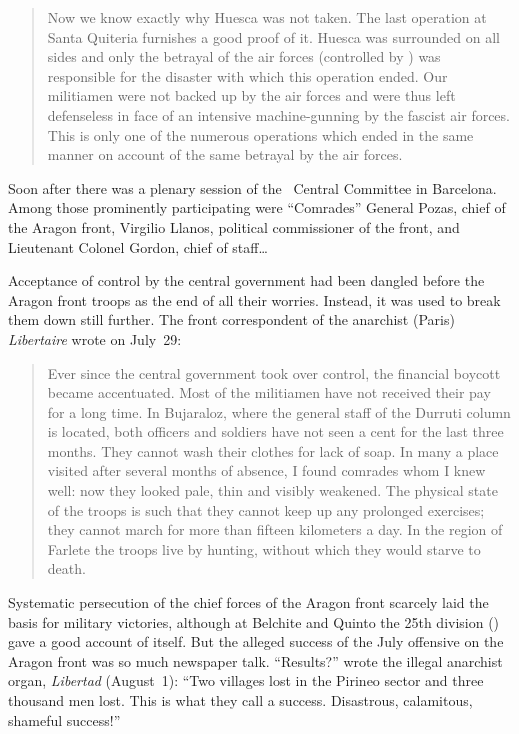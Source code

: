 \begin{quotation}
  Now we know exactly why Huesca was not taken. The last operation at Santa Quiteria furnishes a good proof of it. Hues\-ca was surrounded on all sides and only the betrayal of the air forces (controlled by \PSUC) was responsible for the disaster with which this operation ended. Our militiamen were not backed up by the air forces and were thus left defenseless in face of an intensive machine-gunning by the fascist air forces. This is only one of the numerous operations which ended in the same manner on account of the same betrayal by the air forces.
\end{quotation}

\indexPSUC\indexSPozas
Soon after there was a plenary session of the \PSUC\ Central Committee in Barcelona. Among those prominently participating were ``Comrades'' General Pozas, chief of the Aragon front, Virgilio Llanos, political commissioner of the front, and Lieutenant Colonel Gordon, chief of staff\dots

Acceptance of control by the central government had been dangled before the Aragon front troops as the end of all their worries. Instead, it was used to break them down still further. The front correspondent of the anarchist (Paris) \emph{Libertaire} wrote on July~29:

\begin{quotation}
  Ever since the central government took over control, the financial boycott became accentuated. Most of the militiamen have not received their pay for a long time. In Bujaraloz, where the general staff of the Durruti column is located, both officers and soldiers have not seen a cent for the last three months. They cannot wash their clothes for lack of soap. In many a place visited after several months of absence, I found comrades whom I knew well: now they looked pale, thin and visibly weakened. The physical state of the troops is such that they cannot keep up any prolonged exercises; they cannot march for more than fifteen kilometers a day. In the region of Farlete the troops live by hunting, without which they would starve to death.
\end{quotation}

\indexLibertad{}
Systematic persecution of the chief forces of the Aragon front scarcely laid the basis for military victories, although at Belchite and Quinto the 25th division (\CNT) gave a good account of itself. But the alleged success of the July offensive on the Aragon front was so much newspaper talk. ``Results?'' wrote the illegal anarchist organ, \emph{Libertad} (August~1): ``\kp Two villages lost in the Pirineo sector and three thousand men lost. This is what they call a success. Disastrous, calamitous, shameful success!''

